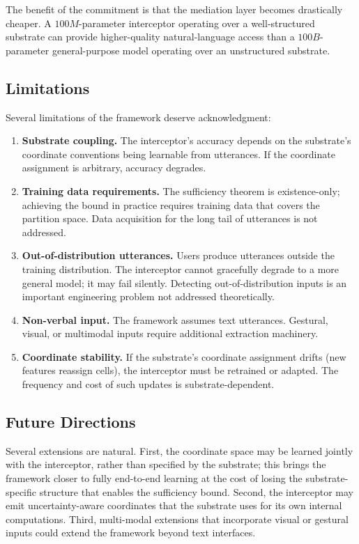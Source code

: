 \documentclass[11pt,a4paper]{article}
\theoremstyle{definition}
\theoremstyle{remark}
\begin{document}
The benefit of the commitment is that the mediation layer becomes drastically cheaper. A $100M$-parameter interceptor operating over a well-structured substrate can provide higher-quality natural-language access than a $100B$-parameter general-purpose model operating over an unstructured substrate.

\subsection{Limitations}

Several limitations of the framework deserve acknowledgment:

\begin{enumerate}
    \item \textbf{Substrate coupling.} The interceptor's accuracy depends on the substrate's coordinate conventions being learnable from utterances. If the coordinate assignment is arbitrary, accuracy degrades.

    \item \textbf{Training data requirements.} The sufficiency theorem is existence-only; achieving the bound in practice requires training data that covers the partition space. Data acquisition for the long tail of utterances is not addressed.

    \item \textbf{Out-of-distribution utterances.} Users produce utterances outside the training distribution. The interceptor cannot gracefully degrade to a more general model; it may fail silently. Detecting out-of-distribution inputs is an important engineering problem not addressed theoretically.

    \item \textbf{Non-verbal input.} The framework assumes text utterances. Gestural, visual, or multimodal inputs require additional extraction machinery.

    \item \textbf{Coordinate stability.} If the substrate's coordinate assignment drifts (new features reassign cells), the interceptor must be retrained or adapted. The frequency and cost of such updates is substrate-dependent.
\end{enumerate}

\subsection{Future Directions}

Several extensions are natural. First, the coordinate space may be learned jointly with the interceptor, rather than specified by the substrate; this brings the framework closer to fully end-to-end learning at the cost of losing the substrate-specific structure that enables the sufficiency bound. Second, the interceptor may emit uncertainty-aware coordinates that the substrate uses for its own internal computations. Third, multi-modal extensions that incorporate visual or gestural inputs could extend the framework beyond text interfaces.
\end{document}
